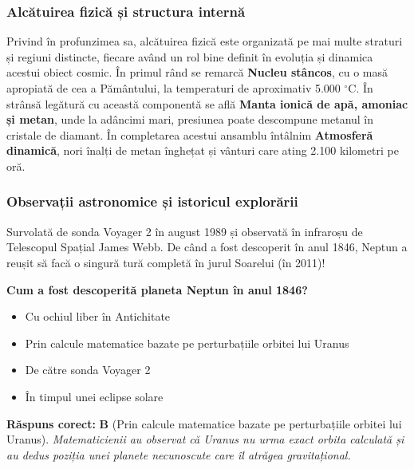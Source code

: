 \subsubsection*{Alcătuirea fizică și structura internă}
Privind în profunzimea sa, alcătuirea fizică este organizată pe mai multe straturi și regiuni distincte, fiecare având un rol bine definit în evoluția și dinamica acestui obiect cosmic. În primul rând se remarcă \textbf{Nucleu stâncos}, cu o masă apropiată de cea a Pământului, la temperaturi de aproximativ 5.000 $^\circ$C. În strânsă legătură cu această componentă se află \textbf{Manta ionică de apă, amoniac și metan}, unde la adâncimi mari, presiunea poate descompune metanul în cristale de diamant. În completarea acestui ansamblu întâlnim \textbf{Atmosferă dinamică}, nori înalți de metan înghețat și vânturi care ating 2.100 kilometri pe oră.

\subsubsection*{Observații astronomice și istoricul explorării}
Survolată de sonda Voyager 2 în august 1989 și observată în infraroșu de Telescopul Spațial James Webb. De când a fost descoperit în anul 1846, Neptun a reușit să facă o singură tură completă în jurul Soarelui (în 2011)!

\vspace{6pt}
\begin{tcolorbox}[orbitarquiz, title={\textbf{Întrebare de verificare \#30: Neptun}}]
\textbf{Cum a fost descoperită planeta Neptun în anul 1846?}
\begin{itemize}[leftmargin=2.2em, itemsep=2pt, topsep=4pt]
  \item[$\square$ \textbf{A.}] Cu ochiul liber în Antichitate
  \item[$\square$ \textbf{B.}] Prin calcule matematice bazate pe perturbațiile orbitei lui Uranus
  \item[$\square$ \textbf{C.}] De către sonda Voyager 2
  \item[$\square$ \textbf{D.}] În timpul unei eclipse solare
\end{itemize}
\vspace{2pt}
{\footnotesize\color{orbitarMuted}\textbf{Răspuns corect:} \textbf{B} (Prin calcule matematice bazate pe perturbațiile orbitei lui Uranus). \emph{Matematicienii au observat că Uranus nu urma exact orbita calculată și au dedus poziția unei planete necunoscute care îl atrăgea gravitațional.}}
\end{tcolorbox}
\clearpage


